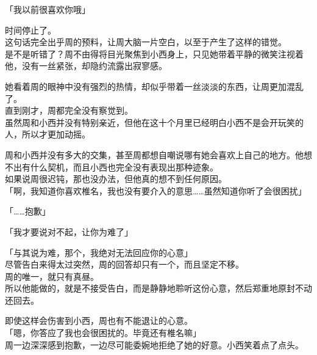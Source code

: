 \vspace{2\baselineskip}

「我以前很喜欢你哦」\\

\vspace{2\baselineskip}

时间停止了。\\

这句话完全出乎周的预料，让周大脑一片空白，以至于产生了这样的错觉。\\

是不是听错了？周不由得将目光聚焦到小西身上，只见她带着平静的微笑注视着他，没有一丝紧张，却隐约流露出寂寥感。

她看着周的眼神中没有强烈的热情，却似乎带着一丝淡淡的东西，让周更加混乱了。\\

直到刚才，周都完全没有察觉到。\\

虽然周和小西并没有特别亲近，但他在这十个月里已经明白小西不是会开玩笑的人，所以才更加动摇。

周和小西并没有多大的交集，甚至周都想自嘲说哪有她会喜欢上自己的地方。他想不出有什么契机，而且小西也完全没有表现出那种迹象。\\

如果说周很迟钝，那也没办法，但他真的想不到任何原因。\\

「啊，我知道你喜欢椎名，我也没有要介入的意思……虽然知道你听了会很困扰」

「……抱歉」

「我才要说对不起，让你为难了」

「与其说为难，那个，我绝对无法回应你的心意」\\

尽管告白来得太过突然，周的回答却只有一个，而且坚定不移。\\

周的唯一，就只有真昼。\\

所以他能做的，就是不接受告白，而是静静地聆听这份心意，然后郑重地原封不动还回去。

即使这样会伤害到小西，周也有不能退让的心意。\\

「嗯，你答应了我也会很困扰的。毕竟还有椎名嘛」\\

周一边深深感到抱歉，一边尽可能委婉地拒绝了她的好意。小西笑着点了点头。\\

